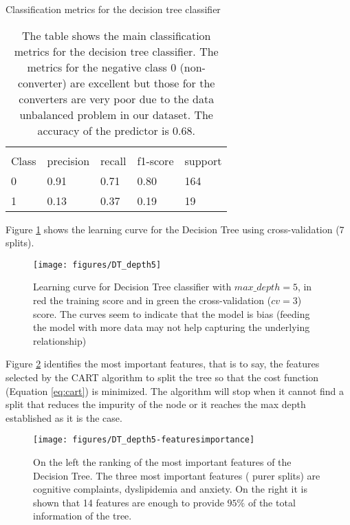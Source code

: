 \documentclass[11pt]{article}
\theoremstyle{definition}
\theoremstyle{remark}
\begin{document}
\begin{table}[H]
\caption{Classification metrics for the decision tree classifier}
\begin{center} 
\begin{tabular}{lllll}
\hline
\multicolumn{1}{c}{} \\
Class & precision & recall & f1-score & support     \\
\hline
0 & 0.91 &  0.71  &  0.80  & 164 \\
1 & 0.13 &  0.37  &  0.19  & 19  \\
\hline
\end{tabular}
\caption{The table shows the main classification metrics for the decision tree classifier. The metrics for the negative class 0 (non-converter) are excellent but those for the converters are very poor due to the data unbalanced problem in our dataset. The accuracy of the predictor is 0.68.
}  \label{tab:dectree} 
\end{center}
\end{table}


Figure \ref{fig:dt-md5-learning} shows the learning curve for the Decision Tree using cross-validation (7 splits). 
\begin{figure}[H]
        \centering
        \texttt{[image: figures/DT\_depth5]}
        \caption{Learning curve for Decision Tree classifier with $max\_depth=5$, in red the training score and in green the cross-validation ($cv=3$) score. The curves seem to indicate that the model is bias (feeding the model with more data may not help capturing the underlying relationship)
        } \label{fig:dt-md5-learning}
\end{figure}

Figure \ref{fig:dt-md5-features} identifies the most important features, that is to say, the features selected by the CART algorithm to split the tree so that the cost function (Equation \ref{eq:cart}) is minimized. The algorithm will stop when it cannot find a split that reduces the impurity of the node or it reaches the max depth established as it is the case.
\begin{figure}[H]
        \centering
        \texttt{[image: figures/DT\_depth5-featuresimportance]}
        \caption{On the left the ranking of the most important features of the Decision Tree. The three most important features ( purer splits) are cognitive complaints, dyslipidemia and anxiety. On the right it is shown that 14 features are enough to provide $95\%$ of the total information of the tree.   
        } \label{fig:dt-md5-features}
\end{figure}
\end{document}
